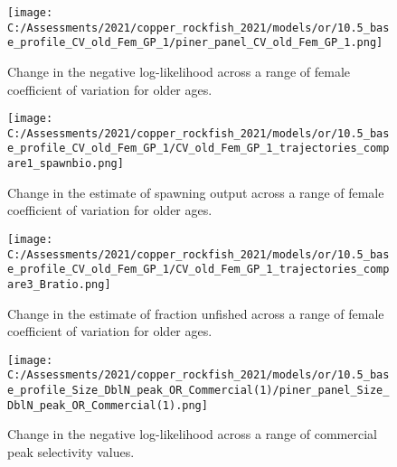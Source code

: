 \documentclass[11pt,
  english,
  a4paper,
]{article}
\begin{document}
\begin{figure}
\centering
\texttt{[image: C:/Assessments/2021/copper\_rockfish\_2021/models/or/10.5\_base\_profile\_CV\_old\_Fem\_GP\_1/piner\_panel\_CV\_old\_Fem\_GP\_1.png]}
\caption{Change in the negative log-likelihood across a range of female coefficient of variation for older ages.\label{fig:cv-profile}}
\end{figure}

\tagmcend\tagstructend


\begin{figure}
\centering
\texttt{[image: C:/Assessments/2021/copper\_rockfish\_2021/models/or/10.5\_base\_profile\_CV\_old\_Fem\_GP\_1/CV\_old\_Fem\_GP\_1\_trajectories\_compare1\_spawnbio.png]}
\caption{Change in the estimate of spawning output across a range of female coefficient of variation for older ages.\label{fig:cv-ssb}}
\end{figure}

\tagmcend\tagstructend


\begin{figure}
\centering
\texttt{[image: C:/Assessments/2021/copper\_rockfish\_2021/models/or/10.5\_base\_profile\_CV\_old\_Fem\_GP\_1/CV\_old\_Fem\_GP\_1\_trajectories\_compare3\_Bratio.png]}
\caption{Change in the estimate of fraction unfished across a range of female coefficient of variation for older ages.\label{fig:cv-depl}}
\end{figure}

\tagmcend\tagstructend


\begin{figure}
\centering
\texttt{[image: C:/Assessments/2021/copper\_rockfish\_2021/models/or/10.5\_base\_profile\_Size\_DblN\_peak\_OR\_Commercial(1)/piner\_panel\_Size\_DblN\_peak\_OR\_Commercial(1).png]}
\caption{Change in the negative log-likelihood across a range of commercial peak selectivity values.\label{fig:selex-profile}}
\end{figure}

\tagmcend\tagstructend

\end{document}
